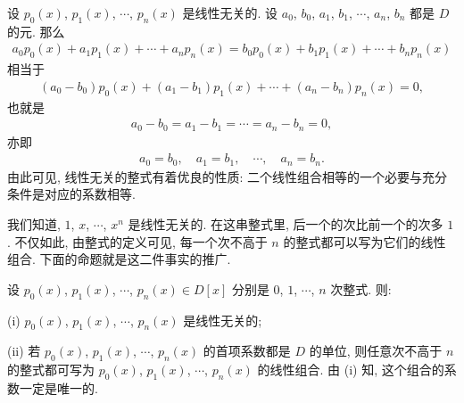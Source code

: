 \begin{remark}
    设 $p_0 (x)$, $p_1 (x)$, $\cdots$, $p_n (x)$ 是线性无关的. 设 $a_0$, $b_0$, $a_1$, $b_1$, $\cdots$, $a_n$, $b_n$ 都是 $D$ 的元. 那么
    \begin{align*}
        a_0 p_0 (x) + a_1 p_1 (x) + \cdots + a_n p_n (x) = b_0 p_0 (x) + b_1 p_1 (x) + \cdots + b_n p_n (x)
    \end{align*}
    相当于
    \begin{align*}
        (a_0 - b_0) p_0 (x) + (a_1 - b_1) p_1 (x) + \cdots + (a_n - b_n) p_n (x) = 0,
    \end{align*}
    也就是
    \begin{align*}
        a_0 - b_0 = a_1 - b_1 = \cdots = a_n - b_n = 0,
    \end{align*}
    亦即
    \begin{align*}
        a_0 = b_0, \quad a_1 = b_1, \quad \cdots, \quad a_n = b_n.
    \end{align*}
    由此可见, 线性无关的整式有着优良的性质: 二个线性组合相等的一个必要与充分条件是对应的系数相等.
\end{remark}

我们知道, $1$, $x$, $\cdots$, $x^n$ 是线性无关的. 在这串整式里, 后一个的次比前一个的次多 $1$. 不仅如此, 由整式的定义可见, 每一个次不高于 $n$ 的整式都可以写为它们的线性组合. 下面的命题就是这二件事实的推广.

\begin{proposition}
    设 $p_0 (x)$, $p_1 (x)$, $\cdots$, $p_n (x) \in D[x]$ 分别是 $0$, $1$, $\cdots$, $n$ 次整式. 则:

    (i) $p_0 (x)$, $p_1 (x)$, $\cdots$, $p_n (x)$ 是线性无关的;

    (ii) 若 $p_0 (x)$, $p_1 (x)$, $\cdots$, $p_n (x)$ 的首项系数都是 $D$ 的单位, 则任意次不高于 $n$ 的整式都可写为 $p_0 (x)$, $p_1 (x)$, $\cdots$, $p_n (x)$ 的线性组合. 由 (i) 知, 这个组合的系数一定是唯一的.
\end{proposition}

